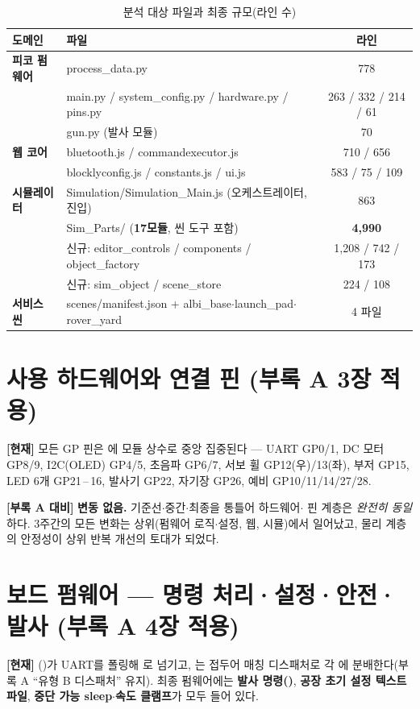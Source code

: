 \begin{table}[htbp]\centering\small
\caption{분석 대상 파일과 최종 규모(라인 수)}
\renewcommand{\arraystretch}{1.22}
\begin{tabularx}{\linewidth}{@{}>{\sffamily\bfseries}l >{\ttfamily\footnotesize}X c@{}}
\toprule
\sffamily 도메인 & \sffamily 파일 & \sffamily 라인 \\
\midrule
피코 펌웨어 & process\_data.py & 778 \\
            & main.py / system\_config.py / hardware.py / pins.py & 263 / 332 / 214 / 61 \\
            & gun.py (발사 모듈) & 70 \\
웹 코어 & bluetooth.js / commandexecutor.js & 710 / 656 \\
        & blocklyconfig.js / constants.js / ui.js & 583 / 75 / 109 \\
시뮬레이터 & Simulation/Simulation\_Main.js (오케스트레이터, 진입) & 863 \\
           & Sim\_Parts/ (\textbf{17모듈}, 씬 도구 포함) & \textbf{4{,}990} \\
           & \quad 신규: editor\_controls / components / object\_factory & 1{,}208 / 742 / 173 \\
           & \quad 신규: sim\_object / scene\_store & 224 / 108 \\
서비스 씬 & scenes/manifest.json + albi\_base$\cdot$launch\_pad$\cdot$rover\_yard & 4 파일 \\
\bottomrule
\end{tabularx}
\end{table}

\section{사용 하드웨어와 연결 핀 (부록 A 3장 적용)}
\textbf{[현재]} 모든 GP 핀은 에 모듈 상수로 중앙 집중된다 --- UART GP0/1,
DC 모터 GP8/9, I2C(OLED) GP4/5, 초음파 GP6/7, 서보 휠 GP12(우)/13(좌), 부저 GP15, LED 6개
GP21\,--\,16, 발사기 GP22, 자기장 GP26, 예비 GP10/11/14/27/28.

\smallskip
\noindent\textbf{[부록 A 대비]} \textbf{변동 없음.} 기준선$\cdot$중간$\cdot$최종을 통틀어 하드웨어$\cdot$%
핀 계층은 \emph{완전히 동일}하다. 3주간의 모든 변화는 상위(펌웨어 로직$\cdot$설정, 웹, 시뮬)에서
일어났고, 물리 계층의 안정성이 상위 반복 개선의 토대가 되었다.

\section{보드 펌웨어 --- 명령 처리·설정·안전·발사 (부록 A 4장 적용)}
\textbf{[현재]} ()가 UART를 폴링해
로 넘기고, 는 접두어 매칭 디스패처로 각
에 분배한다(부록 A ``유형 B 디스패처'' 유지). 최종 펌웨어에는 \textbf{발사
명령()}, \textbf{공장 초기 설정 텍스트 파일}, \textbf{중단 가능 sleep$\cdot$속도
클램프}가 모두 들어 있다.

